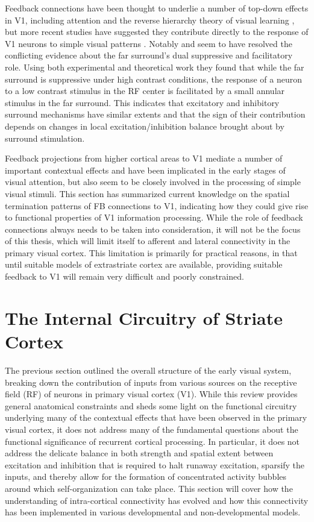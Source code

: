 Feedback connections have been thought to underlie a number of top-down
effects in V1, including attention \citep{Treue2003} and the reverse
hierarchy theory of visual learning \citep{Ahissar2004}, but more
recent studies have suggested they contribute directly to the response
of V1 neurons to simple visual patterns
\citep{Angelucci2002,Angelucci2003,Schwabe2006}. Notably
\cite{Schwabe2006} and \cite{Ichida2007} seem to have resolved the
conflicting evidence about the far surround's dual suppressive and
facilitatory role. Using both experimental and theoretical work they
found that while the far surround is suppressive under high contrast
conditions, the response of a neuron to a low contrast stimulus in the
RF center is facilitated by a small annular stimulus in the far
surround. This indicates that excitatory and inhibitory surround
mechanisms have similar extents and that the sign of their
contribution depends on changes in local excitation/inhibition balance
brought about by surround stimulation.

Feedback projections from higher cortical areas to V1 mediate a number
of important contextual effects and have been implicated in the early
stages of visual attention, but also seem to be closely involved in the
processing of simple visual stimuli. This section has summarized
current knowledge on the spatial termination patterns of FB
connections to V1, indicating how they could give rise to functional
properties of V1 information processing. While the role of feedback
connections always needs to be taken into consideration, it will not be the
focus of this thesis, which will limit itself to afferent and lateral
connectivity in the primary visual cortex.  This limitation is
primarily for practical reasons, in that until suitable models of
extrastriate cortex are available, providing suitable feedback to V1
will remain very difficult and poorly constrained.

\section{The Internal Circuitry of Striate Cortex}

The previous section outlined the overall structure of the early visual
system, breaking down the contribution of inputs from various sources
on the receptive field (RF) of neurons in primary visual cortex
(V1). While this review provides general anatomical constraints and sheds
some light on the functional circuitry underlying many of the
contextual effects that have been observed in the primary visual
cortex, it does not address many of the fundamental questions about
the functional significance of recurrent cortical processing. In
particular, it does not address the delicate balance in both strength
and spatial extent between excitation and inhibition that is required
to halt runaway excitation, sparsify the inputs, and thereby allow for
the formation of concentrated activity bubbles around which
self-organization can take place. This section will cover how the
understanding of intra-cortical connectivity has evolved and how this
connectivity has been implemented in various developmental and
non-developmental models.

